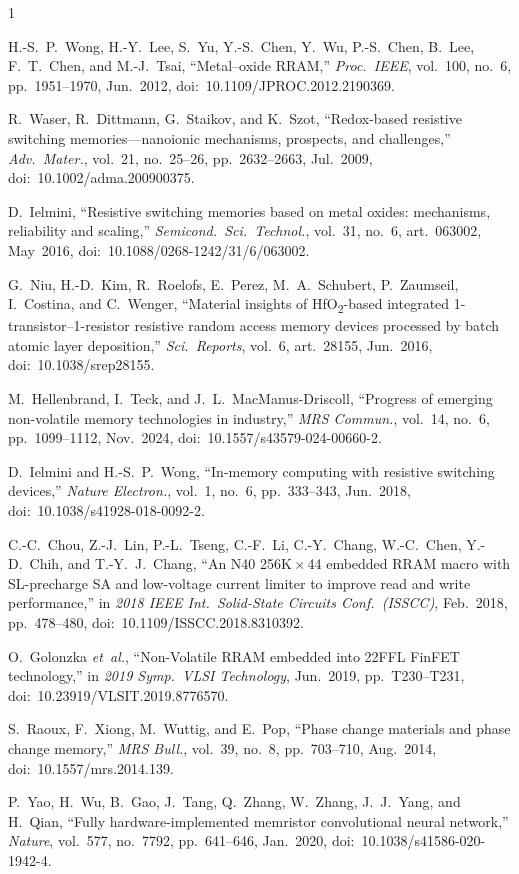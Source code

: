 \documentclass[lettersize,journal]{IEEEtran}
\begin{document}
\begin{thebibliography}{1}


H.-S.\ P.\ Wong, H.-Y.\ Lee, S.\ Yu, Y.-S.\ Chen, Y.\ Wu, P.-S.\ Chen, B.\ Lee, F.\ T.\ Chen, and M.-J.\ Tsai, ``Metal--oxide RRAM,'' \textit{Proc.\ IEEE}, vol.\ 100, no.\ 6, pp.\ 1951--1970, Jun.\ 2012, doi:~10.1109/JPROC.2012.2190369.

R.\ Waser, R.\ Dittmann, G.\ Staikov, and K.\ Szot, ``Redox-based resistive switching memories---nanoionic mechanisms, prospects, and challenges,'' \textit{Adv.\ Mater.}, vol.\ 21, no.\ 25--26, pp.\ 2632--2663, Jul.\ 2009, doi:~10.1002/adma.200900375.

D.\ Ielmini, ``Resistive switching memories based on metal oxides: mechanisms, reliability and scaling,'' \textit{Semicond.\ Sci.\ Technol.}, vol.\ 31, no.\ 6, art.\ 063002, May~2016, doi:~10.1088/0268-1242/31/6/063002.

G.\ Niu, H.-D.\ Kim, R.\ Roelofs, E.\ Perez, M.\ A.\ Schubert, P.\ Zaumseil, I.\ Costina, and C.\ Wenger, ``Material insights of HfO\textsubscript{2}-based integrated 1-transistor--1-resistor resistive random access memory devices processed by batch atomic layer deposition,'' \textit{Sci.\ Reports}, vol.\ 6, art.\ 28155, Jun.\ 2016, doi:~10.1038/srep28155.

M.\ Hellenbrand, I.\ Teck, and J.\ L.\ MacManus-Driscoll, ``Progress of emerging non-volatile memory technologies in industry,'' \textit{MRS Commun.}, vol.\ 14, no.\ 6, pp.\ 1099--1112, Nov.\ 2024, doi:~10.1557/s43579-024-00660-2.

D.\ Ielmini and H.-S.\ P.\ Wong, ``In-memory computing with resistive switching devices,'' \textit{Nature Electron.}, vol.\ 1, no.\ 6, pp.\ 333--343, Jun.\ 2018, doi:~10.1038/s41928-018-0092-2.


C.-C.\ Chou, Z.-J.\ Lin, P.-L.\ Tseng, C.-F.\ Li, C.-Y.\ Chang, W.-C.\ Chen, Y.-D.\ Chih, and T.-Y.\ J.\ Chang, ``An N40 256K\,$\times$\,44 embedded RRAM macro with SL-precharge SA and low-voltage current limiter to improve read and write performance,'' in \textit{2018 IEEE Int.\ Solid-State Circuits Conf.\ (ISSCC)}, Feb.\ 2018, pp.\ 478--480, doi:~10.1109/ISSCC.2018.8310392.

O.\ Golonzka \textit{et~al.}, ``Non-Volatile RRAM embedded into 22FFL FinFET technology,'' in \textit{2019 Symp.\ VLSI Technology}, Jun.\ 2019, pp.\ T230--T231, doi:~10.23919/VLSIT.2019.8776570.

S.\ Raoux, F.\ Xiong, M.\ Wuttig, and E.\ Pop, ``Phase change materials and phase change memory,'' \textit{MRS Bull.}, vol.\ 39, no.\ 8, pp.\ 703--710, Aug.\ 2014, doi:~10.1557/mrs.2014.139.

P.\ Yao, H.\ Wu, B.\ Gao, J.\ Tang, Q.\ Zhang, W.\ Zhang, J.\ J.\ Yang, and H.\ Qian, ``Fully hardware-implemented memristor convolutional neural network,'' \textit{Nature}, vol.\ 577, no.\ 7792, pp.\ 641--646, Jan.\ 2020, doi:~10.1038/s41586-020-1942-4.

\end{thebibliography}
\end{document}
